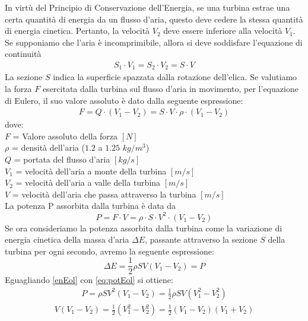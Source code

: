 In virtù del Principio di Conservazione dell'Energia, se una turbina estrae una certa quantità di energia da un flusso d'aria, questo deve cedere la stessa quantità di energia cinetica. Pertanto, la velocità $V_2$ deve essere inferiore alla velocità $V_1$. Se supponiamo che l'aria è incomprimibile, allora si deve soddisfare l'equazione di continuità
\begin{align*}
S_1 \cdot V_1 = S_2 \cdot V_2 = S \cdot V
\end{align*}
La sezione $S$ indica la superficie spazzata dalla rotazione dell'elica.
Se valutiamo la forza $F$ esercitata dalla turbina sul flusso d'aria in movimento, per l'equazione di Eulero, il suo valore assoluto è dato dalla seguente espressione:
\begin{align*}
F = Q \cdot \left( V_1 - V_2 \right) = S \cdot V \cdot \rho \cdot \left( V_1 - V_2 \right)
\end{align*}
dove:\\
$F$ = Valore assoluto della forza $[N]$\\
$\rho$ = densità dell'aria ($1.2$ a $1.25$ $kg/m^3$)\\
$Q$ = portata del flusso d'aria $[kg/s]$\\
$V_1$ = velocità dell'aria a monte della turbina $[m/s]$\\
$V_2$ = velocità dell'aria a valle della turbina $[m/s]$\\
$V$ = velocità dell'aria che passa attraverso la turbina $[m/s]$\\[2mm]
La potenza P assorbita dalla turbina è data da 
\begin{equation}\label{eq:potEol}
P = F \cdot V = \rho \cdot S \cdot V^2 \cdot \left( V_1 - V_2 \right)
\end{equation}
Se ora consideriamo la potenza assorbita dalla turbina come la variazione di energia cinetica della massa d'aria $\Delta E$, passante attraverso la sezione $S$ della turbina per ogni secondo, avremo la seguente espressione:
\begin{equation}\label{enEol}
\Delta E = \frac{1}{2} \rho	S V \left(V_1 - V_2 \right) = P
\end{equation}
Eguagliando \ref{enEol} con \ref{eq:potEol} si ottiene:
\begin{align*}
P = \rho S V^2 \left(V_1 - V_2 \right) = \frac{1}{2} \rho S V \left(V_1^2-V_2^2 \right)
\end{align*}
\begin{align*}
V \left(V_1 - V_2 \right) = \frac{1}{2} \left(V_1^2-V_2^2 \right) = \frac{1}{2} \left(V_1-V_2 \right)\left(V_1+V_2 \right)
\end{align*}
